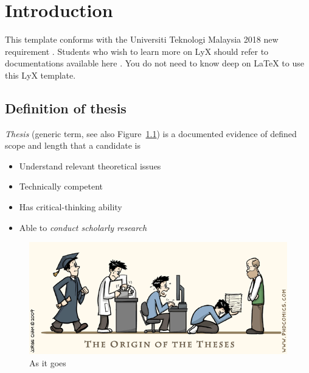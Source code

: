 \documentclass[oneside]{utmthesis}
\begin{document}
\listofabbre
{}


\listofsymbols
{}


\listofappendices


\mainmatter


\chapter{Introduction}

This template conforms with the Universiti Teknologi Malaysia 2018 new requirement \cite{utm:thesis:manual}.
Students who wish to learn more on LyX should refer to documentations
available here \cite{lyx:download}. You do not need to know deep
on LaTeX \cite{latex:wikibook} to use this LyX template.

\section{Definition of thesis }

\noindent \emph{Thesis} (generic term, see also Figure~\ref{fig1})
is a documented evidence of defined scope and length that a candidate
is 
\begin{itemize}
\item Understand relevant theoretical issues
\item Technically competent
\item Has critical-thinking ability
\item Able to \emph{conduct scholarly research}
\end{itemize}
\begin{figure}[h]
\begin{centering}
\includegraphics[width=1\textwidth]{./figs/pasted13}
\par\end{centering}
\caption{As it goes}
\label{fig1}

\end{figure}
\end{document}
